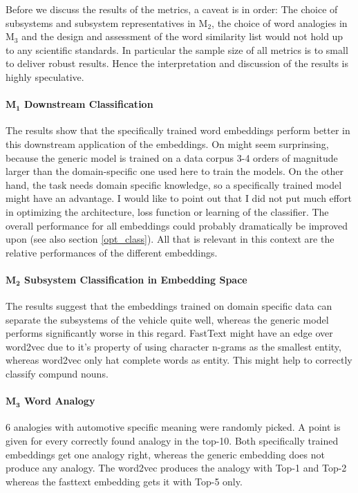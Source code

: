 \documentclass[10pt,a4paper]{article}
\begin{document}
Before we discuss the results of the metrics, a caveat is in order: The choice of subsystems and subsystem representatives in M$_2$, the choice of word analogies in M$_3$ and the design and assessment of the word similarity list would not hold up to any scientific standards. In particular the sample size of all metrics is to small to deliver robust results. Hence the interpretation and discussion of the results is highly speculative.

\paragraph{$\boldsymbol{M_1}$ Downstream Classification}

The results show that the specifically trained word embeddings perform better in this downstream application of the embeddings. On might seem surprinsing, because the generic model is trained on a data corpus 3-4 orders of magnitude larger than the domain-specific one used here to train the models. On the other hand, the task needs domain specific knowledge, so a specifically trained model might have an advantage. 
I would like to point out that I did not put much effort in optimizing the architecture, loss function or learning of the classifier. The overall performance for all embeddings could probably dramatically be improved upon (see also section \ref{opt_class}). All that is relevant in this context are the relative performances of the different embeddings.

\paragraph{$\boldsymbol{M_2}$ Subsystem Classification in Embedding Space} The results suggest that the embeddings trained on domain specific data can separate the subsystems of the vehicle quite well, whereas the generic model performs significantly worse in this regard. FastText might have an edge over word2vec due to it's property of using character n-grams as the smallest entity, whereas word2vec only hat complete words as entity. This might help to correctly classify compund nouns. 

\paragraph{$\boldsymbol{M_3}$ Word Analogy}
6 analogies with automotive specific meaning were randomly picked. A point is given for every correctly found analogy in the top-10. Both specifically trained embeddings get one analogy right, whereas the generic embedding does not produce any analogy. The word2vec produces the analogy with Top-1 and Top-2 whereas the fasttext embedding gets it with Top-5 only.
\end{document}
